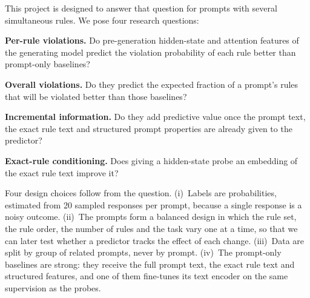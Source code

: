 \documentclass[10pt]{article}
\begin{document}
This project is designed to answer that question for prompts with several simultaneous rules. We pose four research
questions:
\begin{description}[leftmargin=3.2em,labelwidth=2.6em,labelsep=0.6em,font=\normalfont\bfseries]
\item[RQ1] \textbf{Per-rule violations.} Do pre-generation hidden-state and attention features of the generating model
predict the violation probability of each rule better than prompt-only baselines?
\item[RQ2] \textbf{Overall violations.} Do they predict the expected fraction of a prompt's rules that will be violated
better than those baselines?
\item[RQ3] \textbf{Incremental information.} Do they add predictive value once the prompt text, the exact rule text and
structured prompt properties are already given to the predictor?
\item[RQ4] \textbf{Exact-rule conditioning.} Does giving a hidden-state probe an embedding of the exact rule text
improve it?
\end{description}

Four design choices follow from the question. (i)~Labels are probabilities, estimated from 20 sampled responses per
prompt, because a single response is a noisy outcome. (ii)~The prompts form a balanced design in which the rule set, the
rule order, the number of rules and the task vary one at a time, so that we can later test whether a predictor tracks
the effect of each change. (iii)~Data are split by group of related prompts, never by prompt. (iv)~The prompt-only
baselines are strong: they receive the full prompt text, the exact rule text and structured features, and one of them
fine-tunes its text encoder on the same supervision as the probes.
\end{document}
